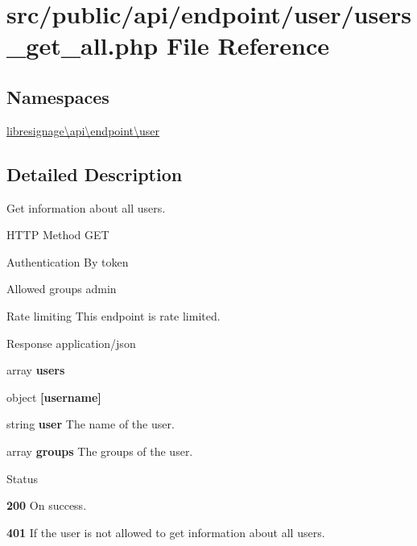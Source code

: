 \hypertarget{src_2public_2api_2endpoint_2user_2users__get__all_8php}{}\section{src/public/api/endpoint/user/users\+\_\+get\+\_\+all.php File Reference}
\label{src_2public_2api_2endpoint_2user_2users__get__all_8php}
\subsection*{Namespaces}
\begin{DoxyCompactItemize}
\item 
 \hyperlink{namespacelibresignage_1_1api_1_1endpoint_1_1user}{libresignage\textbackslash{}api\textbackslash{}endpoint\textbackslash{}user}
\end{DoxyCompactItemize}


\subsection{Detailed Description}
Get information about all users.

\begin{DoxyParagraph}{H\+T\+TP Method}
G\+ET 
\end{DoxyParagraph}
\begin{DoxyParagraph}{Authentication}
By token 
\end{DoxyParagraph}
\begin{DoxyParagraph}{Allowed groups}
{\ttfamily admin} 
\end{DoxyParagraph}
\begin{DoxyParagraph}{Rate limiting}
This endpoint is rate limited.
\end{DoxyParagraph}
\begin{DoxyParagraph}{Response}
application/json
\begin{DoxyItemize}
\item {\ttfamily array} {\bfseries users}
\begin{DoxyItemize}
\item {\ttfamily object} {\bfseries \mbox{[}username\mbox{]}}
\begin{DoxyItemize}
\item {\ttfamily string} {\bfseries user} The name of the user.
\item {\ttfamily array} {\bfseries groups} The groups of the user.
\end{DoxyItemize}
\end{DoxyItemize}
\end{DoxyItemize}
\end{DoxyParagraph}
\begin{DoxyParagraph}{Status}

\begin{DoxyItemize}
\item {\bfseries 200} On success.
\item {\bfseries 401} If the user is not allowed to get information about all users. 
\end{DoxyItemize}
\end{DoxyParagraph}
